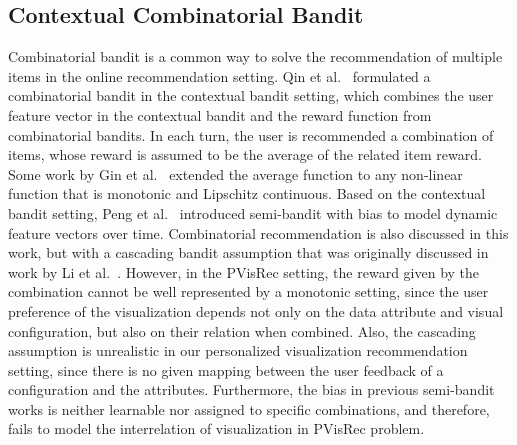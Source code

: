 \subsection{Contextual Combinatorial Bandit}
Combinatorial bandit is a common way to solve the recommendation of multiple items in the online recommendation setting.
Qin et al.~\cite{qin_contextual_2014} formulated a combinatorial bandit in the contextual bandit setting, which combines the user feature vector in the contextual bandit and the reward function from combinatorial bandits. 
In each turn, the user is recommended a combination of items, whose reward is assumed to be the average of the related item reward. 
Some work by Gin et al.~\cite{qin_contextual_2014} extended the average function to any non-linear function that is monotonic and Lipschitz continuous. Based on the contextual bandit setting, Peng et al.~\cite{peng2019practical} introduced semi-bandit with bias to model dynamic feature vectors over time. 
Combinatorial recommendation is also discussed in this work, but with a cascading bandit assumption that was originally discussed in work by Li et al.~\cite{li2016contextual}. 
However, in the PVisRec setting, the reward given by the combination cannot be well represented by a monotonic setting, since the user preference of the visualization depends not only on the data attribute and visual configuration, but also on their relation when combined. Also, the cascading assumption is unrealistic in our personalized visualization recommendation setting, since there is no given mapping between the user feedback of a configuration and the attributes. Furthermore, the bias in previous semi-bandit works is neither learnable nor assigned to specific combinations, and therefore, fails to model the interrelation of visualization in PVisRec problem. 



